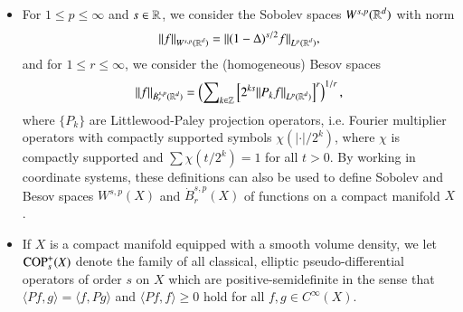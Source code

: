 \begin{itemize}

    \item For $1 \leq p \leq \infty$ and $s \in \operatorname{\mathbb{R}}$, we consider the Sobolev spaces $W^{s,p}(\operatorname{\mathbb{R}}^d)$ with norm
    \[ \| f \|_{W^{s,p}(\operatorname{\mathbb{R}}^d)} = \| (1-\Delta)^{s/2} f \|_{L^p(\operatorname{\mathbb{R}}^d)}, \]
    and for $1 \leq r \leq \infty$, we consider the (homogeneous) Besov spaces
    \[ \| f \|_{\dot{B}^{s,p}_r(\operatorname{\mathbb{R}}^d)} = \left( \sum\nolimits_{k \in \operatorname{\mathbb{Z}}} \left[ 2^{ks} \| P_k f \|_{L^p(\operatorname{\mathbb{R}}^d)} \right]^r \right)^{1/r}, \]
    where $\{ P_k \}$ are Littlewood-Paley projection operators, i.e. Fourier multiplier operators with compactly supported symbols $\chi( |\cdot| / 2^k )$, where $\chi$ is compactly supported and $\sum \chi(t/2^k) = 1$ for all $t > 0$. By working in coordinate systems, these definitions can also be used to define Sobolev and Besov spaces $W^{s,p}(X)$ and $\dot{B}^{s,p}_r(X)$ of functions on a compact manifold $X$.

    \item If $X$ is a compact manifold equipped with a smooth volume density, we let ${\text{COP}^{+}_{{s}}}(X)$ denote the family of all classical, elliptic pseudo-differential operators of order $s$ on $X$ which are positive-semidefinite in the sense that $\langle Pf, g \rangle = \langle f, Pg \rangle$ and $\langle Pf, f \rangle \geq 0$ hold for all $f,g \in C^\infty(X)$.
\end{itemize}